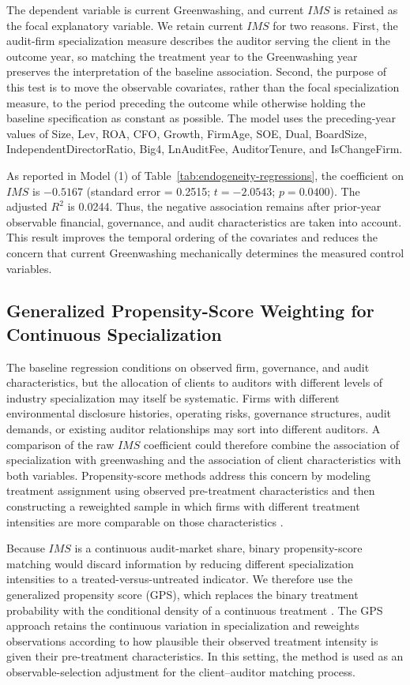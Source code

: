 \documentclass[11pt]{article}
\begin{document}
The dependent variable is current Greenwashing, and current \(IMS\) is retained as the focal explanatory variable. 
We retain current \(IMS\) for two reasons. First, the audit-firm specialization measure describes the auditor serving the client in the outcome year, so matching the treatment year to the Greenwashing year preserves the interpretation of the baseline association. 
Second, the purpose of this test is to move the observable covariates, rather than the focal specialization measure, to the period preceding the outcome while otherwise holding the baseline specification as constant as possible. 
The model uses the preceding-year values of Size, Lev, ROA, CFO, Growth, FirmAge, SOE, Dual, BoardSize, IndependentDirectorRatio, Big4, LnAuditFee, AuditorTenure, and IsChangeFirm.

As reported in Model (1) of Table~\ref{tab:endogeneity-regressions}, the coefficient on \(IMS\) is \(-0.5167\) (standard error = 0.2515; \(t=-2.0543\); \(p=0.0400\)). 
The adjusted \(R^2\) is 0.0244. 
Thus, the negative association remains after prior-year observable financial, governance, and audit characteristics are taken into account. 
This result improves the temporal ordering of the covariates and reduces the concern that current Greenwashing mechanically determines the measured control variables. 

\subsection{Generalized Propensity-Score Weighting for Continuous Specialization}

The baseline regression conditions on observed firm, governance, and audit characteristics, but the allocation of clients to auditors with different levels of industry specialization may itself be systematic.
Firms with different environmental disclosure histories, operating risks, governance structures, audit demands, or existing auditor relationships may sort into different auditors. 
A comparison of the raw \(IMS\) coefficient could therefore combine the association of specialization with greenwashing and the association of client characteristics with both variables. 
Propensity-score methods address this concern by modeling treatment assignment using observed pre-treatment characteristics and then constructing a reweighted sample in which firms with different treatment intensities are more comparable on those characteristics \citep{shipman2017psm}.

Because \(IMS\) is a continuous audit-market share, binary propensity-score matching would discard information by reducing different specialization intensities to a treated-versus-untreated indicator. 
We therefore use the generalized propensity score (GPS), which replaces the binary treatment probability with the conditional density of a continuous treatment \citep{imbens2000,hiranoimbens2004}. 
The GPS approach retains the continuous variation in specialization and reweights observations according to how plausible their observed treatment intensity is given their pre-treatment characteristics. 
In this setting, the method is used as an observable-selection adjustment for the client--auditor matching process.
\end{document}
